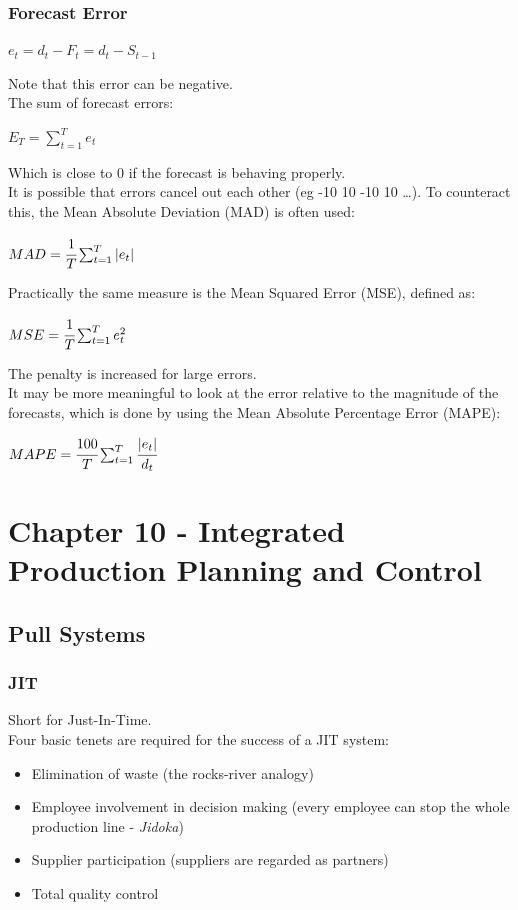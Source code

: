 \documentclass[12pt]{article}
\begin{document}
\subsubsection{Forecast Error}
\begin{center}
$e_t = d_t - F_t = d_t - S_{t-1}$
\end{center}
Note that this error can be negative.\\
The sum of forecast errors:
\begin{center}
$E_T = \sum_{t=1}^{T}e_t$
\end{center}
Which is close to $0$ if the forecast is behaving properly.\\
It is possible that errors cancel out each other (eg -10 10 -10 10 \dots). To counteract this, the Mean Absolute Deviation (MAD) is often used:
\begin{center}
$MAD = \cfrac{1}{T}\sum_{t = 1}^{T}|e_t|$
\end{center}
Practically the same measure is the Mean Squared Error (MSE), defined as:
\begin{center}
$MSE = \cfrac{1}{T}\sum_{t = 1}^{T}e_{t}^2$
\end{center}
The penalty is increased for large errors.\\
It may be more meaningful to look at the error relative to the magnitude of the forecasts, which is done by using the Mean Absolute Percentage Error (MAPE):
\begin{center}
$MAPE = \cfrac{100}{T}\sum_{t=1}^{T}\cfrac{|e_t|}{d_t}$
\end{center}
\clearpage
\section{Chapter 10 - Integrated Production Planning and Control}
\setcounter{subsection}{3}
\subsection{Pull Systems}
\setcounter{subsubsection}{2}
\subsubsection{JIT}
Short for Just-In-Time.\\
Four basic tenets are required for the success of a JIT system:
\begin{itemize}
\item Elimination of waste (the rocks-river analogy)
\item Employee involvement in decision making (every employee can stop the whole production line - \textit{Jidoka})
\item Supplier participation (suppliers are regarded as partners)
\item Total quality control
\end{itemize}
\end{document}
